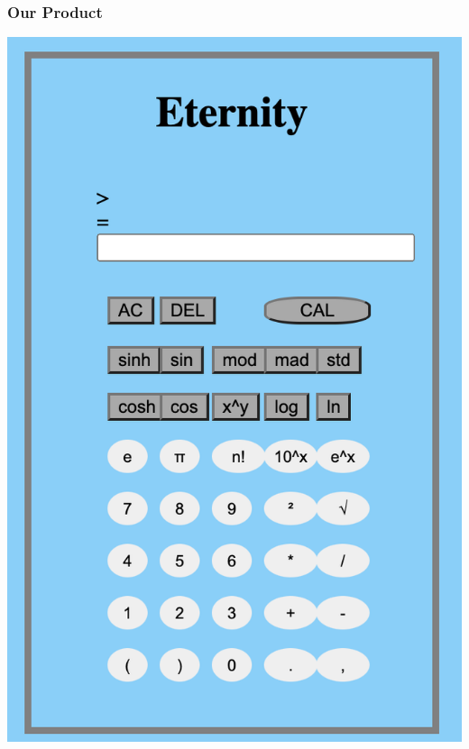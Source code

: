 \documentclass{beamer}
\begin{document}
\begin{frame}
\frametitle{Our Product}
\centering
\includegraphics[scale = 0.4]{Calculator}
\end{frame}

\end{document}

